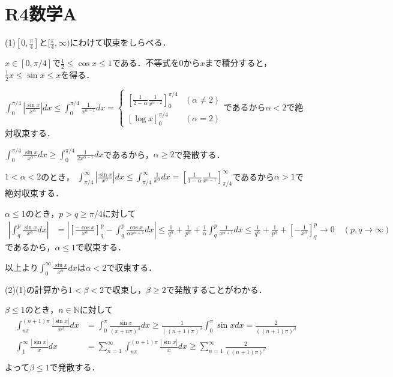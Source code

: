 \documentclass[
		book,
		head_space=20mm,
		foot_space=20mm,
		gutter=10mm,
		line_length=190mm
]{jlreq}
\begin{document}
\section{R4数学A}
(1)$[0,\frac{\pi}{4}]$と$[\frac{\pi}{4},\infty)$にわけて収束をしらべる．

$x\in [0,\pi/4]$で$\frac{1}{2}\le\cos x \le 1$である．不等式を$0$から$x$まで積分すると，$\frac{1}{2}x \le \sin x \le x$を得る．

$\int_0^{\pi/4} \left|\frac{\sin x}{x^\alpha}\right|dx\le \int_0^{\pi/4} \frac{1}{x^{\alpha-1}}dx=\begin{cases}
\left[ \frac{1}{2-\alpha}\frac{1}{x^{\alpha-2}} \right]_0^{\pi/4} & (\alpha\neq 2)\\
\left[\log x \right]_0^{\pi/4} & (\alpha=2)
\end{cases}$であるから$\alpha<2$で絶対収束する．

$\int_0^{\pi/4}\frac{\sin x}{x^\alpha}dx\ge \int_0^{\pi/4} \frac{1}{2x^{\alpha-1}}dx$であるから，$\alpha\ge 2$で発散する．

$1<\alpha<2$のとき，
$\int_{\pi/4}^{\infty} \left|\frac{\sin x}{x^\alpha}\right|dx\le \int_{\pi/4}^{\infty} \frac{1}{x^\alpha}dx=
\left[ \frac{1}{1-\alpha}\frac{1}{x^{\alpha-1}} \right]_{\pi/4}^{\infty}$であるから$\alpha>1$で絶対収束する．

$\alpha\le 1$のとき，$p>q\ge\pi/4$に対して
\begin{align}
	\left| \int_q^p \frac{\sin x}{x^\alpha}dx \right|&=\left| \left[ \frac{-\cos x}{x^\alpha} \right]_q^p-\int_q^p \frac{\cos x}{\alpha x^{\alpha+1}}dx \right|\le \frac{1}{q^\alpha}+\frac{1}{p^\alpha}+\frac{1}{\alpha}\int_q^p \frac{1}{x^{\alpha+1}}dx\le \frac{1}{q^\alpha}+\frac{1}{p^\alpha}+\left[ -\frac{1}{x^\alpha} \right]_q^p\rightarrow 0\quad(p,q \rightarrow \infty)
\end{align} 
であるから，$\alpha\le1$で収束する．

以上より$\int_0^\infty \frac{\sin x}{x^\alpha}dx$は$\alpha<2$で収束する．

(2)(1)の計算から$1<\beta<2$で収束し，$\beta\ge 2$で発散することがわかる．

$\beta\le 1$のとき，$n\in \mathbb{N}$に対して
\begin{align}
	\int_{n\pi}^{(n+1)\pi}\frac{|\sin x|}{x^\beta}dx&=\int_0^\pi \frac{\sin x}{(x+n\pi)^\beta}dx\ge \frac{1}{((n+1)\pi)^\beta}\int_0^\pi \sin xdx=\frac{2}{((n+1)\pi)^\beta}\\
	\int_{1}^{\infty}\frac{|\sin x|}{x}dx&=\sum_{n=1}^\infty \int_{n\pi}^{(n+1)\pi}\frac{|\sin x|}{x}dx\ge \sum_{n=1}^\infty \frac{2}{((n+1)\pi)^\beta}\\
\end{align}
よって$\beta\le 1$で発散する．
\end{document}
